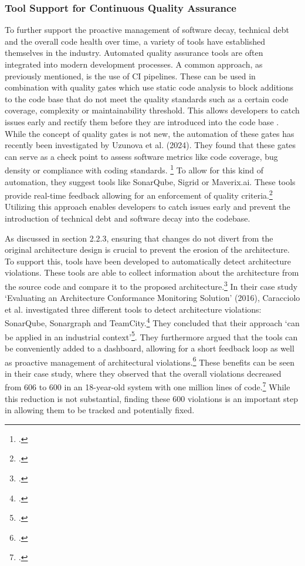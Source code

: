 \subsubsection{Tool Support for Continuous Quality Assurance}
To further support the proactive management of software decay, technical debt and the overall code health over time, a variety of tools have established themselves in the industry.
Automated quality assurance tools are often integrated into modern development processes. A common approach, as previously mentioned, is the use of \ac{CI} pipelines. These can be used in combination with quality gates which use static code analysis to block additions to the code base that do not meet the quality standards such as a 
certain code coverage, complexity or maintainability threshold. This allows developers to catch issues early and rectify them before they are introduced into the code base . While the concept of quality gates is not new, the automation of these gates has recently been investigated by Uzunova et al. (2024).
They found that these gates can serve as a check point to assess software metrics like code coverage, bug density or compliance with coding standards. \footcite[8]{uzunovaQualityGatesSoftware2024}
To allow for this kind of automation, they suggest tools like SonarQube, Sigrid or Maverix.ai. These tools provide real-time feedback allowing for an enforcement of quality criteria.\footcite[8]{uzunovaQualityGatesSoftware2024}
Utilizing this approach enables developers to catch issues early and prevent the introduction of technical debt and software decay into the codebase.

As discussed in section 2.2.3, ensuring that changes do not divert from the original architecture design is crucial to prevent the erosion of the architecture.
To support this, tools have been developed to automatically detect architecture violations. These tools are able to collect information about the architecture from the source code
and compare it to the proposed architecture.\footcite[6]{thomasStaticDynamicArchitecture2017} In their case study 
`Evaluating an Architecture Conformance Monitoring Solution' (2016), Caracciolo et al. investigated three different tools to detect architecture violations:
SonarQube, Sonargraph and TeamCity.\footcite[43]{caraccioloEvaluatingArchitectureConformance2016} They concluded that their approach 
`can be applied in an industrial context'\footcite[44]{caraccioloEvaluatingArchitectureConformance2016}.
They furthermore argued that the tools can be conveniently added to a dashboard, allowing for a short feedback loop as well as proactive management of architectural violations.\footcite[44]{caraccioloEvaluatingArchitectureConformance2016}
These benefits can be seen in their case study, where they observed that the overall violations decreased from 606 to 600 in an 18-year-old system with one million lines of code.\footcite[43]{caraccioloEvaluatingArchitectureConformance2016}
While this reduction is not substantial, finding these 600 violations is an important step in allowing them to be tracked and potentially fixed.

